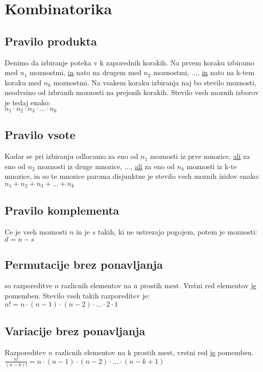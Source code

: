 \section{Kombinatorika}

\subsection*{Pravilo produkta}
Denimo da izbiranje poteka v k zaporednih korakih. Na prvem koraku izbiramo med $n_1$
moznostmi, \underline{in} nato na drugem med $n_2$ moznostmi, ..., \underline{in} nato
na k-tem koraku med $n_k$ moznostmi. Na vsakem koraku izbiranja naj bo stevilo moznosti,
neodvsino od izbranih moznosti na prejsnih korakih. Stevilo vseh moznih izborov je 
tedaj enako:\\
$n_1\cdot n_2\cdot n_3\cdot ...\cdot n_k$

\subsection*{Pravilo vsote}
Kadar se pri izbiranju odlocamo za eno od $n_1$ moznosti iz prve mnozice, \underline{ali}
za eno od $n_2$ moznosti iz druge mnozice, ..., \underline{ali} za eno od $n_k$ 
moznosti iz k-te mnozice, in so te mnozice paroma disjunktne je stevilo vseh moznih
izidov enako:\\
$n_1+n_2+n_3+...+n_k$

\subsection*{Pravilo komplementa}
Ce je vseh moznosti $n$ in je $s$ takih, ki ne ustrezajo pogojem, potem je moznosti:\\
$d=n-s$\\


\subsection*{Permutacije brez ponavljanja}
so razporeditve $n$ razlicnih elementov na $\text{n prostih mest}$. Vrstni red elementov
\underline{je} pomemben. Stevilo vseh takih razporeditev je:\\
$n!=n\cdot (n-1)\cdot (n-2)\cdot ... \cdot 2\cdot 1$

\subsection*{Variacije brez ponavljanja}
Razporeditev $n$ razlicnih elementov na $\text{k prostih mest}$, vrstni red 
\underline{je} pomemben.
$\frac{n!}{(n-k)!}=n\cdot (n-1)\cdot (n-2)\cdot ... \cdot (n-k+1)$\\

